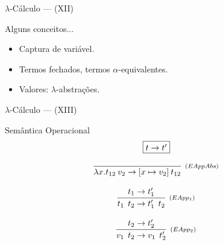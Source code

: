 \documentclass{beamer}
\begin{document}
   \begin{frame}{$\lambda$-Cálculo --- (XII)}
      \begin{block}{Alguns conceitos...}
         \begin{itemize}
            \item Captura de variável.
            \item Termos fechados, termos $\alpha$-equivalentes.
            \item Valores: $\lambda$-abstrações.
         \end{itemize}
      \end{block}
   \end{frame}
   \begin{frame}{$\lambda$-Cálculo --- (XIII)}
      \begin{block}{Semântica Operacional}
          \[
              \begin{array}{c}
                  \fbox{$t\to t'$}\\ \\
                  \begin{array}{c}
                     \infer[_{(EAppAbs)}]
                           {\lambda x. t_{12}\:v_2 \to [x\mapsto v_2]\:t_{12}}
                           {} \\ \\
                     \infer[_{(EApp_1)}]
                           {t_1\:\:t_2\to t'_1\:\:t_2}
                           {t_1\to t'_1} \\ \\
                     \infer[_{(EApp_2)}]
                           {v_1\:\:t_2\to v_1\:\:t'_2}
                           {t_2 \to t'_2}
                  \end{array}
              \end{array}
          \]
      \end{block}
   \end{frame}
\end{document}
